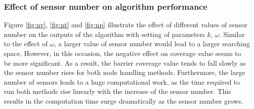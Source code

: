 \subsubsection{Effect of sensor number on algorithm performance}

Figure \ref{fig:nv}, \ref{fig:nt} and \ref{fig:np} illustrate the effect of different values of sensor number on the outputs of the algorithm with setting of parameters $k$, $\omega$. Similar to the effect of $\omega$, a larger value of sensor number would lead to a larger searching space. However, in this occasion, the negative effect on coverage value seems to be more significant. As a result, the barrier coverage value tends to fall slowly as the sensor number rises for both node handling methods. Furthermore, the large number of sensors leads to a huge computational work, as the time required to run both methods rise linearly with the increase of the sensor number. This results in the computation time surge dramatically as the sensor number grows.

